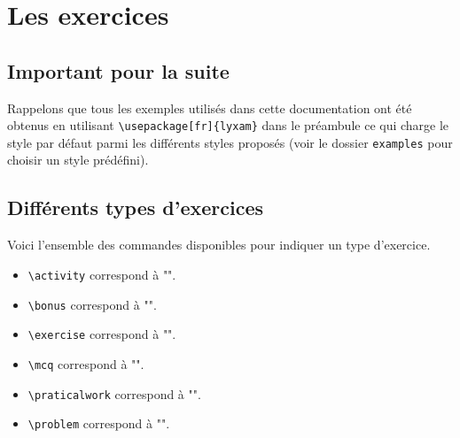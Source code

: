 \documentclass[12pt,a4paper]{scrartcl}
\makeatletter
\theoremstyle{definition}
\newcommand\@IDoptarg{\@ifstar{\@IDoptargStar}{\@IDoptargNoStar}}
\newcommand\@IDoptargStar[2]{%
	\vspace{0.5em}
	--- \texttt{#1%
		\IfStrEq{#2}{}{:}{\,#2:}%
	}%
}
\newcommand\@IDoptargNoStar[2]{%
	\IfStrEq{#2}{}{%
		\@IDoptargStar{#1}{}%
	}{%
		\@IDoptargStar{#1}{\##2}%
	}%
}
\newcommand\IDkey[1]{%
	\@IDoptarg*{Option}{{\itshape "#1"}}%
}
\makeatother
\begin{document}
\newcommand\exosoptions{
\IDkey{pts} le nombre de points avec le cas particulier de $0$ qui demande d'afficher "Non noté".

\IDkey{time} la durée de l'exercice.

\IDkey{id} un texte de votre choix pour remplacer le numéro (ceci a pour effet de bloquer temporairement la numérotation).

\IDkey{title} un titre.

\IDkey{about} une petite indication liée à l'exercice (comme par exemple qu'il ne s'adresse qu'aux élèves motivés).

\IDkey{src} la source utilisée pour confectionner l'exercice.
}


\section{Les exercices}

    \subsection{Important pour la suite}

Rappelons que tous les exemples utilisés dans cette documentation ont été obtenus en utilisant \verb+\usepackage[fr]{lyxam}+ dans le préambule ce qui charge le style par défaut parmi les différents styles proposés (voir le dossier \verb+examples+ pour choisir un style prédéfini).


    \subsection{Différents types d'exercices}

Voici l'ensemble des commandes disponibles pour indiquer un type d'exercice.

\begin{itemize}
\makeatletter
    \item \verb+\activity+ correspond à "\lyxam@text@activity{}".
    
    \item \verb+\bonus+ correspond à "\lyxam@text@bonus{}".
    
    \item \verb+\exercise+ correspond à "\lyxam@text@exercise{}".
    
    \item \verb+\mcq+ correspond à "\lyxam@text@mcq{}".
    
    \item \verb+\praticalwork+ correspond à "\lyxam@text@praticalwork{}".
    
    \item \verb+\problem+ correspond à "\lyxam@text@problem{}".
\makeatother
\end{itemize}
\end{document}
